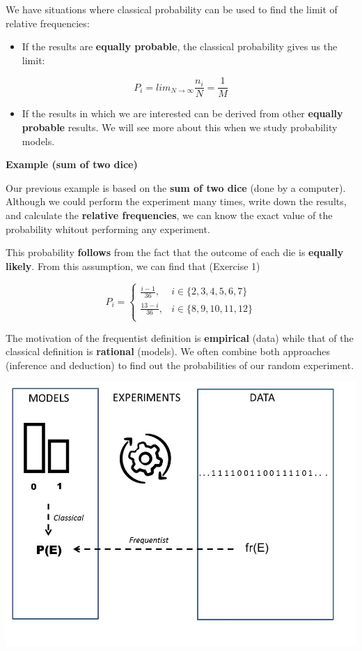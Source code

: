 \documentclass[
]{book}
\providecommand{\tightlist}{%
  \setlength{\itemsep}{0pt}\setlength{\parskip}{0pt}}
\begin{document}
We have situations where classical probability can be used to find the limit of relative frequencies:

\begin{itemize}
\tightlist
\item
  If the results are \textbf{equally probable}, the classical probability gives us the limit:
\end{itemize}

\[P_i=lim_{N\rightarrow \infty} \frac{n_i}{N}=\frac{1}{M}\]

\begin{itemize}
\tightlist
\item
  If the results in which we are interested can be derived from other \textbf{equally probable} results. We will see more about this when we study probability models.
\end{itemize}

\textbf{Example (sum of two dice)}

Our previous example is based on the \textbf{sum of two dice} (done by a computer). Although we could perform the experiment many times, write down the results, and calculate the \textbf{relative frequencies}, we can know the exact value of the probability whitout performing any experiment.

This probability \textbf{follows} from the fact that the outcome of each die is \textbf{equally likely}. From this assumption, we can find that (Exercise 1)

\[
    P_i =
\begin{cases}
\frac{i-1}{36},& i \in \{2,3,4,5,6, 7\} \\
\frac{13-i}{36},& i \in \{8,9,10,11,12\} \\
\end{cases}
\]

The motivation of the frequentist definition is \textbf{empirical} (data) while that of the classical definition is \textbf{rational} (models). We often combine both approaches (inference and deduction) to find out the probabilities of our random experiment.

\includegraphics{./figures/prob.JPG}
\end{document}
